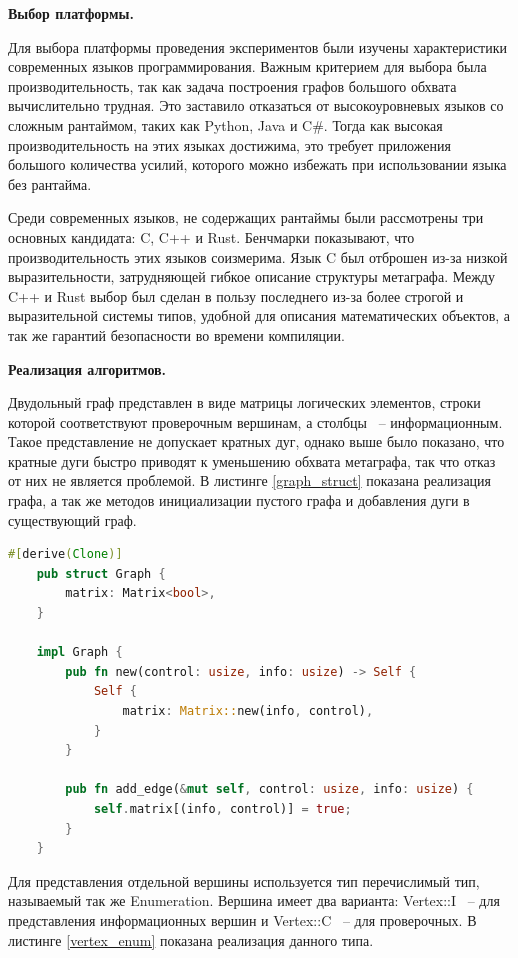 \documentclass[14pt]{mmcs-article}
\begin{document}
\textbf{Выбор платформы.}

Для выбора платформы проведения экспериментов были изучены характеристики современных языков программирования. Важным критерием для выбора была производительность, так как задача построения графов большого обхвата вычислительно трудная. Это заставило отказаться от высокоуровневых языков со сложным рантаймом, таких как Python, Java и C\#. Тогда как высокая производительность на этих языках достижима, это требует приложения большого количества усилий, которого можно избежать при использовании языка без рантайма.

Среди современных языков, не содержащих рантаймы были рассмотрены три основных кандидата: C, C++ и Rust. Бенчмарки показывают, что производительность этих языков соизмерима. Язык C был отброшен из-за низкой выразительности, затрудняющей гибкое описание структуры метаграфа. Между C++ и Rust выбор был сделан в пользу последнего из-за более строгой и выразительной системы типов, удобной для описания математических объектов, а так же гарантий безопасности во времени компиляции.

\textbf{Реализация алгоритмов.}

Двудольный граф представлен в виде матрицы логических элементов, строки которой соответствуют проверочным вершинам, а столбцы ~-- информационным. Такое представление не допускает кратных дуг, однако выше было показано, что кратные дуги быстро приводят к уменьшению обхвата метаграфа, так что отказ от них не является проблемой. В листинге \ref{graph_struct} показана реализация графа, а так же методов инициализации пустого графа и добавления дуги в существующий граф.

\begin{lstlisting}[language=Rust, caption={ Структура, описывающая граф и некоторые её методы. }, label=graph_struct]
    #[derive(Clone)]
    pub struct Graph {
        matrix: Matrix<bool>,
    }

    impl Graph {
        pub fn new(control: usize, info: usize) -> Self {
            Self {
                matrix: Matrix::new(info, control),
            }
        }

        pub fn add_edge(&mut self, control: usize, info: usize) {
            self.matrix[(info, control)] = true;
        }
    }
\end{lstlisting}

Для представления отдельной вершины используется тип перечислимый тип, называемый так же Enumeration. Вершина имеет два варианта: Vertex::I ~-- для представления информационных вершин и Vertex::C ~-- для проверочных. В листинге \ref{vertex_enum} показана реализация данного типа.
\end{document}
